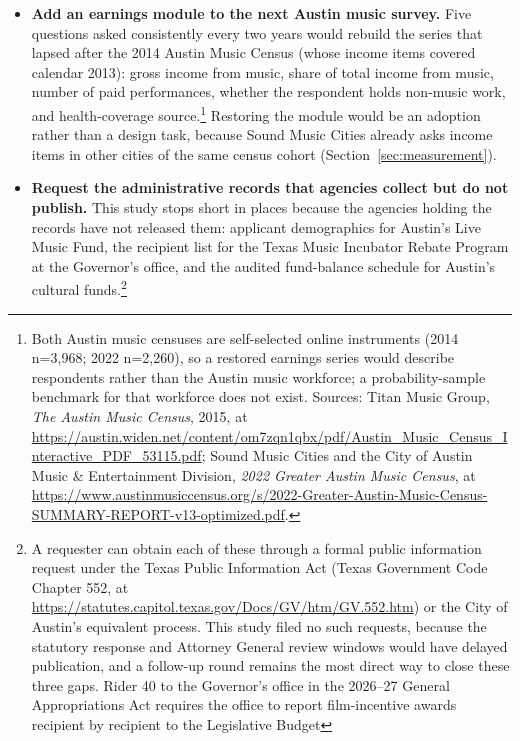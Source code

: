 \begin{itemize}
\item \textbf{Add an earnings module to the next Austin music survey.} Five
      questions asked consistently every two years would rebuild the series
      that lapsed after the 2014 Austin Music Census (whose income items
      covered calendar 2013): gross income from music, share of total income
      from music, number of paid performances, whether the respondent holds
      non-music work, and health-coverage source.\footnote{Both Austin music
      censuses are self-selected online instruments (2014 n=3{,}968; 2022
      n=2{,}260), so a restored earnings series would describe respondents
      rather than the Austin music workforce; a probability-sample benchmark
      for that workforce does not exist. Sources: Titan Music Group,
      \emph{The Austin Music Census}, 2015, at
      \url{https://austin.widen.net/content/om7zqn1qbx/pdf/Austin_Music_Census_Interactive_PDF_53115.pdf};
      Sound Music Cities and the City of Austin Music \& Entertainment
      Division, \emph{2022 Greater Austin Music Census}, at
      \url{https://www.austinmusiccensus.org/s/2022-Greater-Austin-Music-Census-SUMMARY-REPORT-v13-optimized.pdf}.}
      Restoring the module would be an adoption rather than a design task,
      because Sound Music Cities already asks income items in other cities
      of the same census cohort (Section~\ref{sec:measurement}).
\item \textbf{Request the administrative records that agencies collect but do
      not publish.} This study stops short in places because the agencies
      holding the records have not released them: applicant demographics for
      Austin's Live Music Fund, the recipient list for the Texas Music
      Incubator Rebate Program at the Governor's office, and the audited
      fund-balance schedule for Austin's cultural funds.\footnote{A requester
      can obtain each of these through a formal public information request
      under the Texas Public Information Act (Texas Government Code
      Chapter 552, at
      \url{https://statutes.capitol.texas.gov/Docs/GV/htm/GV.552.htm}) or the
      City of Austin's equivalent process. This study filed no such requests,
      because the statutory response and Attorney General review windows would
      have delayed publication, and a follow-up round remains the most direct
      way to close these three gaps. Rider 40 to the Governor's office in the
      2026--27 General Appropriations Act requires the office to report
      film-incentive awards recipient by recipient to the Legislative Budget
}
\end{itemize}
